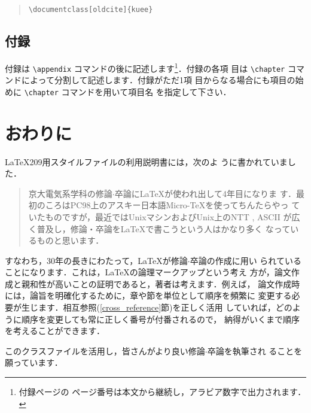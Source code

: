 \documentclass[sotsuron]{kuee}
\begin{document}
\begin{quote}
  \begin{verbatim}
\documentclass[oldcite]{kuee}
\end{verbatim}
\end{quote}

\section{付録}

付録は \verb+\appendix+ コマンドの後に記述します\footnote{付録ページの
  ページ番号は本文から継続し，アラビア数字で出力されます．}．付録の各項
目は \verb+\chapter+ コマンドによって分割して記述します．付録がただ1項
目からなる場合にも項目の始めに \verb+\chapter+ コマンドを用いて項目名
を指定して下さい．


\chapter{おわりに}
\label{chap:conclusion}

\LaTeX{}209用スタイルファイルの利用説明書\cite{OldTebiki}には，次のよ
うに書かれていました．
\begin{quote}
  京大電気系学科の修論$\cdot$卒論に\LaTeX が使われ出して4年目になりま
  す．最初のころはPC98上のアスキー日本語Micro-\TeX を使ってちんたらやっ
  ていたものですが，最近ではUnixマシンおよびUnix上のNTT \JTeX, ASCII
  \JTeX が広く普及し，修論・卒論を\LaTeX で書こうという人はかなり多く
  なっているものと思います．
\end{quote}
すなわち，30年の長きにわたって，\LaTeX{}が修論$\cdot$卒論の作成に用い
られていることになります．これは，\LaTeX{}の論理マークアップという考え
方が，論文作成と親和性が高いことの証明であると，著者は考えます．例えば，
論文作成時には，論旨を明確化するために，章や節を単位として順序を頻繁に
変更する必要が生じます．相互参照(\ref{cross_reference}節)を正しく活用
していれば，どのように順序を変更しても常に正しく番号が付番されるので，
納得がいくまで順序を考えることができます．

このクラスファイルを活用し，皆さんがより良い修論$\cdot$卒論を執筆され
ることを願っています．
\end{document}
